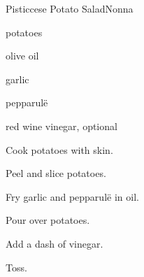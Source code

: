 \begin{recipe}{Pisticcese Potato Salad}{Nonna}{}

\begin{ingredients}
\item potatoes
\item olive oil
\item garlic
\item pepparul\"e
\item red wine vinegar, optional
\end{ingredients}

\begin{directions}
\item Cook potatoes with skin.
\item Peel and slice potatoes.
\item Fry garlic and pepparul\"e in oil.
\item Pour over potatoes.
\item Add a dash of vinegar.
\item Toss.
\end{directions}

\end{recipe}

